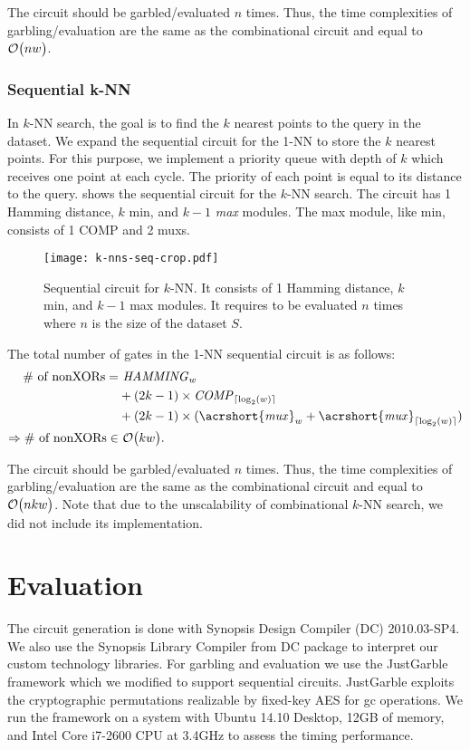The circuit should be garbled/evaluated $n$ times.
Thus, the time complexities of garbling/evaluation are the same as the combinational circuit and equal to $\mathcal{O}\bigl(nw\bigr)$.

\subsubsection{Sequential k-NN}
In $k$-NN search, the goal is to find the $k$ nearest points to the query in the dataset.
We expand the sequential circuit for the 1-NN to store the $k$ nearest points.
For this purpose, we implement a priority queue with depth of $k$ which receives one point at each cycle.
The priority of each point is equal to its distance to the query.
 shows the sequential circuit for the $k$-NN search.
The circuit has 1 Hamming distance, $k$ min, and $k-1$ \emph{max} modules.
The max module, like min, consists of 1 COMP and 2 \acrshort{mux}s.

\begin{figure}
\centering
\texttt{[image: k-nns-seq-crop.pdf]}
\caption{Sequential circuit for $k$-NN.
It consists of 1 Hamming distance, $k$ min, and $k-1$ max modules.
It requires to be evaluated $n$ times where $n$ is the size of the dataset $S$.}
\label{fig:k-nns-seq}
\end{figure}

The total number of gates in the 1-NN sequential circuit is as follows:
\begin{align*}
\text{\# of nonXORs}=			& ~ \mathit{HAMMING}_{w}\\
								& + (2k-1) \times \mathit{COMP}_{\lceil \log _2(w) \rceil} \\
								& + (2k-1) \times (\mathit{\acrshort{mux}}_w  + \mathit{\acrshort{mux}}_{\lceil \log _2(w) \rceil})\\
\Rightarrow \text{\# of nonXORs} \in & ~ \BigO{kw}.
\end{align*}

The circuit should be garbled/evaluated $n$ times.
Thus, the time complexities of garbling/evaluation are the same as the combinational circuit and equal to $\mathcal{O}\bigl(nkw\bigr)$.
Note that due to the unscalability of combinational $k$-NN search, we did not include its implementation.

\section{Evaluation}\label{sec:knn-eval}
The circuit generation is done with Synopsis Design Compiler (DC) 2010.03-SP4.
We also use the Synopsis Library Compiler from DC package to interpret our custom technology libraries.
For garbling and evaluation we use the JustGarble framework \cite{bellare2013efficient} which we modified to support sequential circuits.
JustGarble exploits the cryptographic permutations realizable by fixed-key AES for \acrshort{gc} operations.
We run the framework on a system with Ubuntu 14.10 Desktop, 12GB of memory, and Intel Core i7-2600 CPU at 3.4GHz to assess the timing performance.


